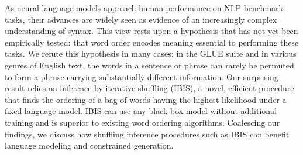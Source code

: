 As neural language models approach human performance on NLP benchmark tasks, their advances are widely seen as evidence of an increasingly complex understanding of syntax. This view rests upon a hypothesis that has not yet been empirically tested: that word order encodes meaning essential to performing these tasks. We refute this hypothesis in many cases: in the GLUE suite and in various genres of English text, the words in a sentence or phrase can rarely be permuted to form a phrase carrying substantially different information. Our surprising result relies on inference by iterative shuffling (IBIS), a novel, efficient procedure that finds the ordering of a bag of words having the highest likelihood under a fixed language model. IBIS can use any black-box model without additional training and is superior to existing word ordering algorithms. Coalescing our findings, we discuss how shuffling inference procedures such as IBIS can benefit language modeling and constrained generation.
